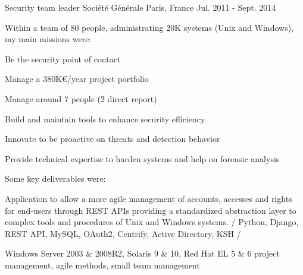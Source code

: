 \begin{cventries}
    \cventry
    {Security team leader} %
    {Société Générale} %
    {Paris, France} %
    {Jul. 2011 - Sept. 2014} %
    { %
        Within a team of 80 people, administrating 20K systems (Unix and Windows), my main missions were: \hfill\break
        \begin{cvitems}
            \item {Be the security point of contact}
            \item {Manage a 380K€/year project portfolio}
            \item {Manage around 7 people (2 direct report)}
            \item {Build and maintain tools to enhance security efficiency}
            \item {Innovate to be proactive on threats and detection behavior}
            \item {Provide technical expertise to harden systems and help on forensic analysis}
        \end{cvitems} \hfill\break
        Some key deliverables were: \hfill\break
        \begin{cvitems}
            \item {Application to allow a more agile management of accounts, accesses and rights for end-users through REST APIs providing a standardized abstraction layer to complex tools and procedures of Unix and Windows systems. / Python, Django, REST API, MySQL, OAuth2, Centrify, Active Directory, KSH /}
        \end{cvitems} \hfill\break
        \begin{cvskills}
             {Windows Server 2003 \& 2008R2, Solaris 9 \& 10, Red Hat EL 5 \& 6}
             {project management, agile methods, small team management}
        \end{cvskills}
    }


\end{cventries}
